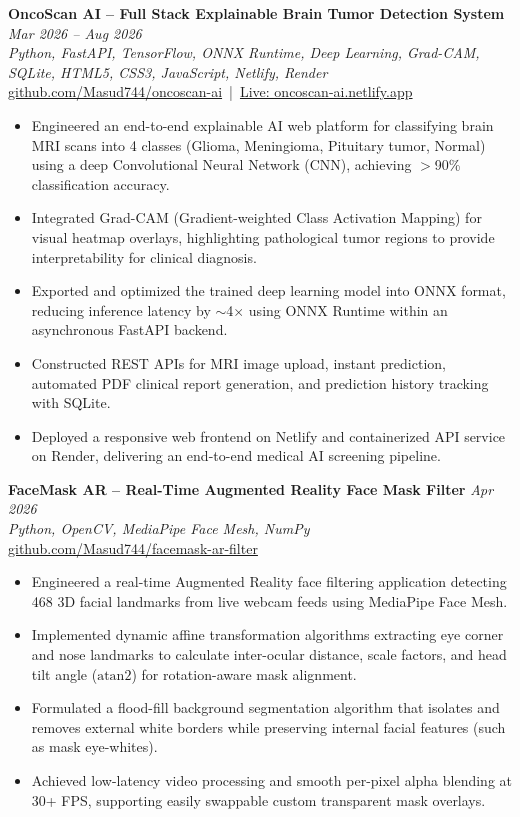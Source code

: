 \documentclass[11pt,a4paper]{article}
\begin{document}
\textbf{OncoScan AI -- Full Stack Explainable Brain Tumor Detection System} \hfill \textit{Mar 2026 -- Aug 2026} \\
\textit{Python, FastAPI, TensorFlow, ONNX Runtime, Deep Learning, Grad-CAM, SQLite, HTML5, CSS3, JavaScript, Netlify, Render} \\
\href{https://github.com/Masud744/oncoscan-ai}{github.com/Masud744/oncoscan-ai} \,|\, \href{https://oncoscan-ai.netlify.app/}{Live: oncoscan-ai.netlify.app}
\begin{itemize}
    \item Engineered an end-to-end explainable AI web platform for classifying brain MRI scans into 4 classes (Glioma, Meningioma, Pituitary tumor, Normal) using a deep Convolutional Neural Network (CNN), achieving $>$90\% classification accuracy.
    \item Integrated Grad-CAM (Gradient-weighted Class Activation Mapping) for visual heatmap overlays, highlighting pathological tumor regions to provide interpretability for clinical diagnosis.
    \item Exported and optimized the trained deep learning model into ONNX format, reducing inference latency by $\sim$4$\times$ using ONNX Runtime within an asynchronous FastAPI backend.
    \item Constructed REST APIs for MRI image upload, instant prediction, automated PDF clinical report generation, and prediction history tracking with SQLite.
    \item Deployed a responsive web frontend on Netlify and containerized API service on Render, delivering an end-to-end medical AI screening pipeline.
\end{itemize}

\textbf{FaceMask AR -- Real-Time Augmented Reality Face Mask Filter} \hfill \textit{Apr 2026} \\
\textit{Python, OpenCV, MediaPipe Face Mesh, NumPy} \\
\href{https://github.com/Masud744/facemask-ar-filter}{github.com/Masud744/facemask-ar-filter}
\begin{itemize}
    \item Engineered a real-time Augmented Reality face filtering application detecting 468 3D facial landmarks from live webcam feeds using MediaPipe Face Mesh.
    \item Implemented dynamic affine transformation algorithms extracting eye corner and nose landmarks to calculate inter-ocular distance, scale factors, and head tilt angle ($\mathrm{atan2}$) for rotation-aware mask alignment.
    \item Formulated a flood-fill background segmentation algorithm that isolates and removes external white borders while preserving internal facial features (such as mask eye-whites).
    \item Achieved low-latency video processing and smooth per-pixel alpha blending at 30+ FPS, supporting easily swappable custom transparent mask overlays.
\end{itemize}
\end{document}
